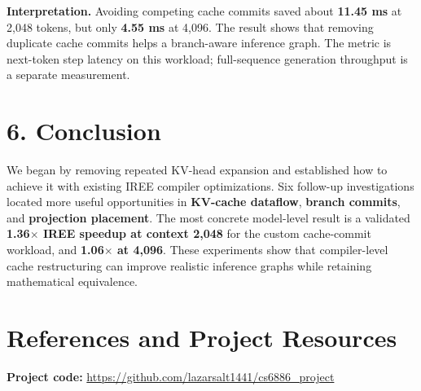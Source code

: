 \documentclass[10pt,a4paper]{article}
\begin{document}
\textbf{Interpretation.} Avoiding competing cache commits saved about \textbf{11.45 ms} at 2,048 tokens, but only \textbf{4.55 ms} at 4,096. The result shows that removing duplicate cache commits helps a branch-aware inference graph. The metric is next-token step latency on this workload; full-sequence generation throughput is a separate measurement.
\vspace{-0.5cm}
\section*{6. Conclusion}
We began by removing repeated KV-head expansion and established how to achieve it with existing IREE compiler optimizations. Six follow-up investigations located more useful opportunities in \textbf{KV-cache dataflow}, \textbf{branch commits}, and \textbf{projection placement}. The most concrete model-level result is a validated \textbf{1.36$\times$ IREE speedup at context 2,048} for the custom cache-commit workload, and \textbf{1.06$\times$ at 4,096}. These experiments show that compiler-level cache restructuring can improve realistic inference graphs while retaining mathematical equivalence.

\newpage
\section*{References and Project Resources}
\noindent\textbf{Project code:} \url{https://github.com/lazarsalt1441/cs6886_project}
\end{document}
